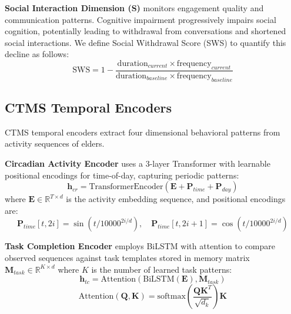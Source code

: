 \documentclass[sigconf, anonymous, 9pt, nonacm]{acmart}
\begin{document}
\noindent\textbf{Social Interaction Dimension (S)} monitors engagement quality and communication patterns. Cognitive impairment progressively impairs social cognition, potentially leading to withdrawal from conversations and shortened social interactions.
We define Social Withdrawal Score (SWS) to quantify this decline as follows:
\begin{equation*}
\text{SWS} = 1 - \frac{\text{duration}_{current} \times \text{frequency}_{current}}{\text{duration}_{baseline} \times \text{frequency}_{baseline}}
\end{equation*}





\subsection{CTMS Temporal Encoders}

CTMS temporal encoders extract four dimensional behavioral patterns from activity sequences of elders.

\noindent\textbf{Circadian Activity Encoder} uses a 3-layer Transformer with learnable positional encodings for time-of-day, capturing periodic patterns:
\begin{equation*}
\mathbf{h}_{cr} = \text{TransformerEncoder}(\mathbf{E} + \mathbf{P}_{time} + \mathbf{P}_{day})
\end{equation*}
where $\mathbf{E} \in \mathbb{R}^{T \times d}$ is the activity embedding sequence, and positional encodings are:
\begin{equation*}
\mathbf{P}_{time}[t, 2i] = \sin(t/10000^{2i/d}), \quad \mathbf{P}_{time}[t, 2i+1] = \cos(t/10000^{2i/d})
\end{equation*}

\noindent\textbf{Task Completion Encoder} employs BiLSTM with attention to compare observed sequences against task templates stored in memory matrix $\mathbf{M}_{task} \in \mathbb{R}^{K \times d}$ where $K$ is the number of learned task patterns:
\begin{equation*}
\mathbf{h}_{tc} = \text{Attention}(\text{BiLSTM}(\mathbf{E}), \mathbf{M}_{task})
\end{equation*}
\begin{equation*}
\text{Attention}(\mathbf{Q}, \mathbf{K}) = \text{softmax}(\frac{\mathbf{Q}\mathbf{K}^T}{\sqrt{d_k}})\mathbf{K}
\end{equation*}
\end{document}
